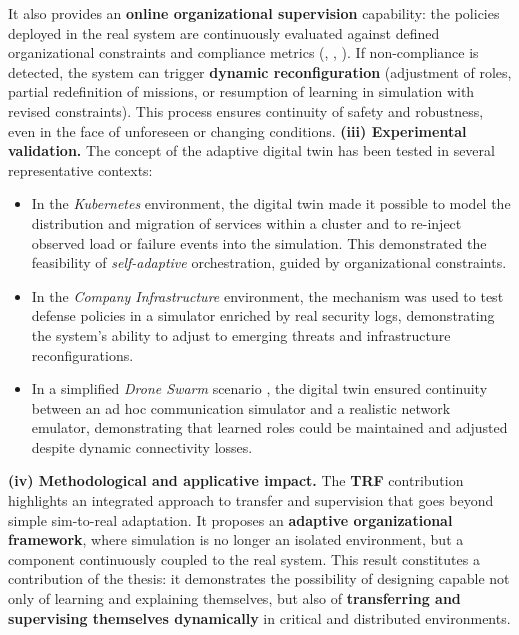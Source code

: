         It also provides an \textbf{online organizational supervision} capability:
        the policies deployed in the real system are continuously evaluated against defined organizational constraints and compliance metrics (, , ).
        If non-compliance is detected, the system can trigger \textbf{dynamic reconfiguration} (adjustment of roles, partial redefinition of missions, or resumption of learning in simulation with revised constraints).
        This process ensures continuity of safety and robustness, even in the face of unforeseen or changing conditions.
        \medskip
        \noindent
        \textbf{(iii) Experimental validation.}
        The concept of the adaptive digital twin has been tested in several representative contexts:
        \begin{itemize}
          \item In the \textit {Kubernetes} environment, the digital twin made it possible to model the distribution and migration of services within a cluster and to re-inject observed load or failure events into the simulation. This demonstrated the feasibility of \textit{self-adaptive} orchestration, guided by organizational constraints.

          \item In the \textit{Company Infrastructure} environment, the mechanism was used to test defense policies in a simulator enriched by real security logs, demonstrating the system's ability to adjust to emerging threats and infrastructure reconfigurations.
          \item In a simplified \textit{Drone Swarm} scenario , the digital twin ensured continuity between an ad hoc communication simulator and a realistic network emulator, demonstrating that learned roles could be maintained and adjusted despite dynamic connectivity losses.
        \end{itemize}
        \medskip
        \noindent
        \textbf{(iv) Methodological and applicative impact.}
        The \textbf{TRF} contribution highlights an integrated approach to transfer and supervision that goes beyond simple sim-to-real adaptation.
        It proposes an \textbf{adaptive organizational framework}, where simulation is no longer an isolated environment, but a component continuously coupled to the real system.
        This result constitutes a contribution of the thesis: it demonstrates the possibility of designing  capable not only of learning and explaining themselves, but also of \textbf{transferring and supervising themselves dynamically} in critical and distributed environments.
